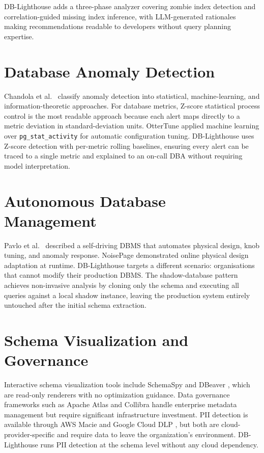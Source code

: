 \documentclass[12pt,a4paper]{report}
\begin{document}
DB-Lighthouse adds a three-phase analyzer covering zombie index detection and correlation-guided missing index inference, with LLM-generated rationales making recommendations readable to developers without query planning expertise.

\section{Database Anomaly Detection}

Chandola et al.\ \cite{chandola2009anomaly} classify anomaly detection into statistical, machine-learning, and information-theoretic approaches. For database metrics, Z-score statistical process control \cite{grubbs1969} is the most readable approach because each alert maps directly to a metric deviation in standard-deviation units. OtterTune \cite{van2017ottertune} applied machine learning over \texttt{pg\_stat\_activity} for automatic configuration tuning. DB-Lighthouse uses Z-score detection with per-metric rolling baselines, ensuring every alert can be traced to a single metric and explained to an on-call DBA without requiring model interpretation.

\section{Autonomous Database Management}

Pavlo et al.\ \cite{pavlo2017selfdriving} described a self-driving DBMS that automates physical design, knob tuning, and anomaly response. NoisePage \cite{ma2021noisepage} demonstrated online physical design adaptation at runtime. DB-Lighthouse targets a different scenario: organisations that cannot modify their production DBMS. The shadow-database pattern achieves non-invasive analysis by cloning only the schema and executing all queries against a local shadow instance, leaving the production system entirely untouched after the initial schema extraction.

\section{Schema Visualization and Governance}

Interactive schema visualization tools include SchemaSpy \cite{schemaspy2022} and DBeaver \cite{dbeaver2023}, which are read-only renderers with no optimization guidance. Data governance frameworks such as Apache Atlas \cite{atlas2023} and Collibra \cite{collibra2023} handle enterprise metadata management but require significant infrastructure investment. PII detection is available through AWS Macie \cite{macie2023} and Google Cloud DLP \cite{clouddlp2023}, but both are cloud-provider-specific and require data to leave the organization's environment. DB-Lighthouse runs PII detection at the schema level without any cloud dependency.
\end{document}
